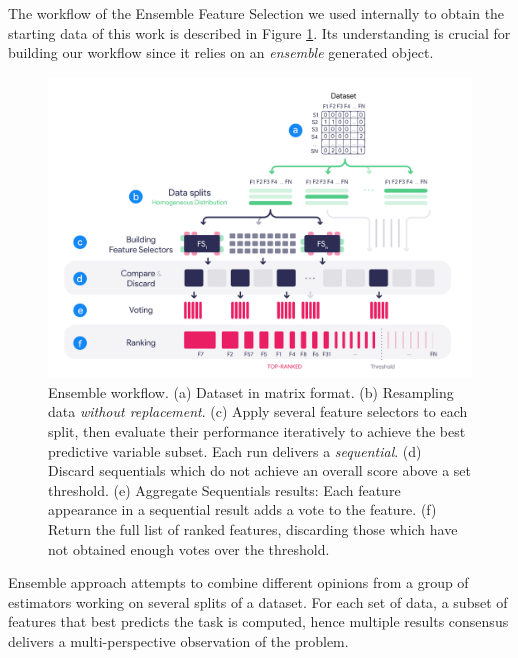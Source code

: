 The workflow of the Ensemble Feature Selection we used internally to obtain the starting data of this work is described in Figure \ref{fig:ensemble-diagram}. Its understanding is crucial for building our workflow since it relies on an \emph{ensemble} generated object.
\\

\begin{figure}[!htpb]
    \centering
    \includegraphics[width=\linewidth]{Minor Thesis/figures/diagrams/Ensemble.png}
    \caption{Ensemble workflow. (a) Dataset in matrix format. (b) Resampling data \emph{without replacement}. (c) Apply several feature selectors to each split, then evaluate their performance iteratively to achieve the best predictive variable subset. Each run delivers a \emph{sequential}. (d) Discard sequentials which do not achieve an overall score above a set threshold. (e) Aggregate Sequentials results: Each feature appearance in a sequential result adds a vote to the feature. (f) Return the full list of ranked features, discarding those which have not obtained enough votes over the threshold.}
    \label{fig:ensemble-diagram}
\end{figure}

Ensemble approach attempts to combine different opinions from a group of estimators working on several splits of a dataset. For each set of data, a subset of features that best predicts the task is computed, hence multiple results consensus delivers a multi-perspective observation of the problem. 
\\


